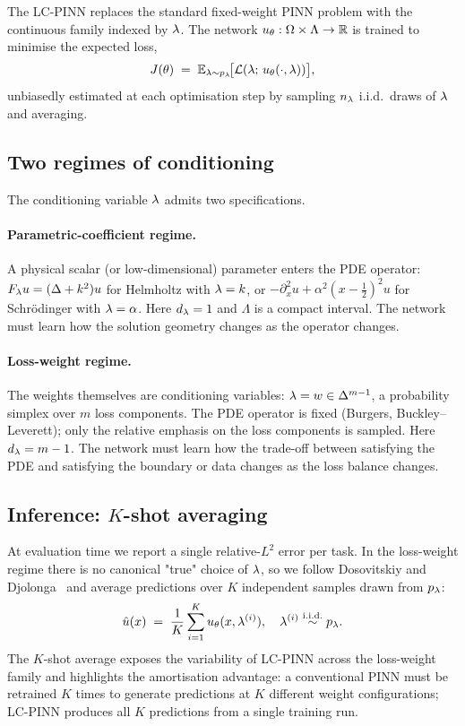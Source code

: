 \documentclass[12pt,a4paper]{extarticle}
\begin{document}
The LC-PINN replaces the standard fixed-weight PINN problem with the continuous family indexed by $\lambda$. The network $u_\theta: \Omega \times \Lambda \to \mathbb{R}$ is trained to minimise the expected loss,
\begin{equation}
    J(\theta) \;=\; \mathbb{E}_{\lambda \sim p_\lambda} \!\bigl[ \mathcal{L}(\lambda;\, u_\theta(\cdot, \lambda)) \bigr],
    \label{eq:lc-J}
\end{equation}
unbiasedly estimated at each optimisation step by sampling $n_\lambda$ i.i.d.\ draws of $\lambda$ and averaging.

\subsection{Two regimes of conditioning}

The conditioning variable $\lambda$ admits two specifications.

\paragraph{Parametric-coefficient regime.} A physical scalar (or low-dimensional) parameter enters the PDE operator: $F_\lambda u = (\Delta + k^2) u$ for Helmholtz with $\lambda = k$, or $-\partial_x^2 u + \alpha^2 (x - \tfrac{1}{2})^2 u$ for Schr\"{o}dinger with $\lambda = \alpha$. Here $d_\lambda = 1$ and $\Lambda$ is a compact interval. The network must learn how the solution geometry changes as the operator changes.

\paragraph{Loss-weight regime.} The weights themselves are conditioning variables: $\lambda = w \in \Delta^{m-1}$, a probability simplex over $m$ loss components. The PDE operator is fixed (Burgers, Buckley--Leverett); only the relative emphasis on the loss components is sampled. Here $d_\lambda = m - 1$. The network must learn how the trade-off between satisfying the PDE and satisfying the boundary or data changes as the loss balance changes.

\subsection{Inference: $K$-shot averaging}

At evaluation time we report a single relative-$L^2$ error per task. In the loss-weight regime there is no canonical "true" choice of $\lambda$, so we follow Dosovitskiy and Djolonga~\cite{dosovitskiy2020} and average predictions over $K$ independent samples drawn from $p_\lambda$:
\begin{equation}
    \hat{u}(x) \;=\; \frac{1}{K} \sum_{i=1}^{K} u_\theta(x, \lambda^{(i)}), \quad \lambda^{(i)} \overset{\mathrm{i.i.d.}}{\sim} p_\lambda.
    \label{eq:k-shot}
\end{equation}
The $K$-shot average exposes the variability of LC-PINN across the loss-weight family and highlights the amortisation advantage: a conventional PINN must be retrained $K$ times to generate predictions at $K$ different weight configurations; LC-PINN produces all $K$ predictions from a single training run.
\end{document}
